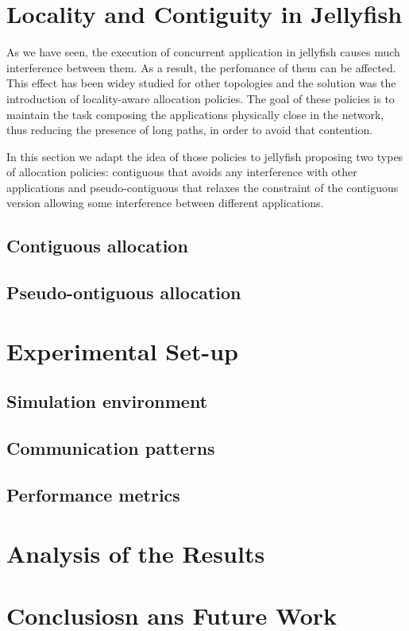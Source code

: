 \documentclass{sig-alternate}
\begin{document}
\section{Locality and Contiguity in Jellyfish}
\label{locality}

As we have seen, the execution of concurrent application in jellyfish causes much interference between them. As a result, the perfomance of them can be affected. This effect has been widey studied for other topologies and the solution was the introduction of locality-aware allocation policies. The goal of these policies is to maintain the task composing the applications physically close in the network, thus reducing the presence of long paths, in order to avoid that contention. 

In this section we adapt the idea of those policies to jellyfish proposing two types of allocation policies: contiguous that avoids any interference with other applications and pseudo-contiguous that relaxes the constraint of the contiguous version allowing some interference between different applications. 

\subsection{Contiguous allocation}
\label{contiguous}

\subsection{Pseudo-ontiguous allocation}
\label{contiguous}


\section{Experimental Set-up}
\label{experimental}

\subsection{Simulation environment}
\label{subsec:simulation}


\subsection{Communication patterns}
\label{subsec:communication}

\subsection{Performance metrics}
\label{subsec:performance}


\section{Analysis of the Results}
\label{analysis}

\section{Conclusiosn ans Future Work}
\label{conclusions}




\end{document}
